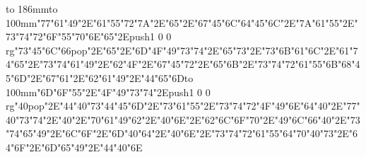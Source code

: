 \hbox to 186mm{\hsize=81mm\vbox to 100mm{\vfill\ipa\char"77\ipa\char"61\ipa\char"49\ipa\char"2E\ipa\char"61\ipa\char"55\ipa\char"72\ipa\char"7A\ipa\char"2E\ipa\char"65\ipa\char"2E\ipa\char"67\ipa\char"45\ipa\char"6C\medskip\ipa\char"64\ipa\char"45\ipa\char"6C\ipa\char"2E\ipa\char"7A\ipa\char"61\ipa\char"55\ipa\char"2E\ipa\char"73\ipa\char"74\ipa\char"72\ipa\char"6F\ipa\char"55\ipa\char"70\medskip\ipa\char"6E\ipa\char"65\ipa\char"2E\pdfcolorstack\match push{1 0 0 rg}\ipa\char"73\ipa\char"45\ipa\char"6C\ipa\char"66\pdfcolorstack\match pop{}\ipa\char"2E\ipa\char"65\ipa\char"2E\ipa\char"6D\ipa\char"4F\ipa\char"49\ipa\char"73\ipa\char"74\ipa\char"2E\ipa\char"65\ipa\char"73\ipa\char"2E\ipa\char"73\ipa\char"6B\ipa\char"61\ipa\char"6C\ipa\char"2E\ipa\char"61\ipa\char"74\medskip\ipa\char"65\ipa\char"2E\ipa\char"73\ipa\char"74\ipa\char"61\ipa\char"49\ipa\char"2E\ipa\char"62\ipa\char"4F\ipa\char"2E\ipa\char"67\ipa\char"45\ipa\char"72\ipa\char"2E\ipa\char"65\ipa\char"6B\ipa\char"2E\ipa\char"73\ipa\char"74\ipa\char"72\ipa\char"61\ipa\char"55\ipa\char"6B\medskip\ipa\char"68\ipa\char"45\ipa\char"6D\ipa\char"2E\ipa\char"67\ipa\char"61\ipa\char"2E\ipa\char"62\ipa\char"61\ipa\char"49\ipa\char"2E\ipa\char"44\ipa\char"65\ipa\char"6D\vfill}\hfill\vbox to 100mm{\vfill\ipa\char"6D\ipa\char"6F\ipa\char"55\ipa\char"2E\ipa\char"4F\ipa\char"49\ipa\char"73\ipa\char"74\ipa\char"2E\pdfcolorstack\match push{1 0 0 rg}\ipa\char"40\pdfcolorstack\match pop{}\ipa\char"2E\ipa\char"44\ipa\char"40\ipa\char"73\medskip\ipa\char"44\ipa\char"45\ipa\char"6D\ipa\char"2E\ipa\char"73\ipa\char"61\ipa\char"55\ipa\char"2E\ipa\char"73\ipa\char"74\ipa\char"72\ipa\char"4F\ipa\char"49\ipa\char"6E\medskip\ipa\char"64\ipa\char"40\ipa\char"2E\ipa\char"77\ipa\char"40\ipa\char"73\ipa\char"74\ipa\char"2E\ipa\char"40\ipa\char"2E\ipa\char"70\ipa\char"61\ipa\char"49\ipa\char"62\ipa\char"2E\ipa\char"40\ipa\char"6E\ipa\char"2E\ipa\char"62\ipa\char"6C\ipa\char"6F\ipa\char"70\ipa\char"2E\ipa\char"49\ipa\char"6C\ipa\char"66\medskip\ipa\char"40\ipa\char"2E\ipa\char"73\ipa\char"74\ipa\char"65\ipa\char"49\ipa\char"2E\ipa\char"6C\ipa\char"6F\ipa\char"2E\ipa\char"6D\ipa\char"40\ipa\char"64\ipa\char"2E\ipa\char"40\ipa\char"6E\ipa\char"2E\ipa\char"73\ipa\char"74\ipa\char"72\ipa\char"61\ipa\char"55\ipa\char"64\medskip\ipa\char"70\ipa\char"40\ipa\char"73\ipa\char"2E\ipa\char"64\ipa\char"6F\ipa\char"2E\ipa\char"6D\ipa\char"65\ipa\char"49\ipa\char"2E\ipa\char"44\ipa\char"40\ipa\char"6E\vfill}}\eject
